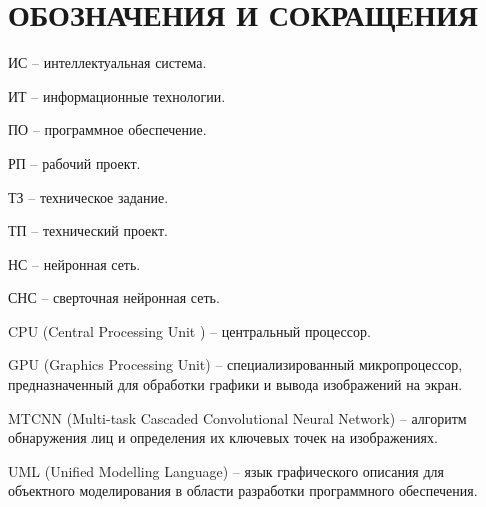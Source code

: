 \section*{ОБОЗНАЧЕНИЯ И СОКРАЩЕНИЯ}

ИС -- интеллектуальная система.

ИТ -- информационные технологии.

ПО -- программное обеспечение.

РП -- рабочий проект.

ТЗ -- техническое задание.

ТП -- технический проект.

НС -- нейронная сеть.

СНС -- сверточная нейронная сеть.

CPU (Central Processing Unit ) -- центральный процессор.

GPU (Graphics Processing Unit) -- специализированный микропроцессор, предназначенный для обработки графики и вывода изображений на экран.

MTCNN (Multi-task Cascaded Convolutional Neural Network) -- алгоритм обнаружения лиц и определения их ключевых точек на изображениях.

UML (Unified Modelling Language) -- язык графического описания для объектного моделирования в области разработки программного обеспечения.